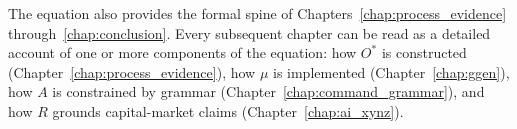 The equation also provides the formal spine of Chapters~\ref{chap:process_evidence} through~\ref{chap:conclusion}. Every subsequent chapter can be read as a detailed account of one or more components of the equation: how $O^{*}$ is constructed (Chapter~\ref{chap:process_evidence}), how $\mu$ is implemented (Chapter~\ref{chap:ggen}), how $A$ is constrained by grammar (Chapter~\ref{chap:command_grammar}), and how $R$ grounds capital-market claims (Chapter~\ref{chap:ai_xynz}).
